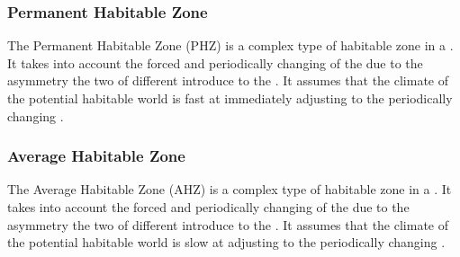 \documentclass[letterpaper,10pt,english]{sphinxmanual}
\begin{document}
\subsubsection{Permanent Habitable Zone}
\label{\detokenize{quantities/habitability/habitable_zones/permanent_habitable_zone:permanent-habitable-zone}}\label{\detokenize{quantities/habitability/habitable_zones/permanent_habitable_zone::doc}}\label{\detokenize{quantities/habitability/habitable_zones/permanent_habitable_zone:id1}}
\sphinxAtStartPar
The Permanent Habitable Zone (PHZ) is a complex type of habitable zone in a {\hyperref[\detokenize{celestial_systems/binary_system:id1}]{}}.
It takes into account the forced and periodically changing {\hyperref[\detokenize{quantities/orbital/eccentricity:id1}]{}}
of the {\hyperref[\detokenize{celestial_bodies/planet:id1}]{}} due to the asymmetry
the two {\hyperref[\detokenize{celestial_bodies/star:id1}]{}} of different {\hyperref[\detokenize{quantities/material/mass:id1}]{}} introduce to the {\hyperref[\detokenize{celestial_systems/stellar_system:id1}]{}}.
It assumes that the climate of the potential habitable world is fast at immediately adjusting to the periodically changing
{\hyperref[\detokenize{quantities/orbital/eccentricity:id1}]{}}.


\subsubsection{Average Habitable Zone}
\label{\detokenize{quantities/habitability/habitable_zones/average_habitable_zone:average-habitable-zone}}\label{\detokenize{quantities/habitability/habitable_zones/average_habitable_zone::doc}}\label{\detokenize{quantities/habitability/habitable_zones/average_habitable_zone:id1}}
\sphinxAtStartPar
The Average Habitable Zone (AHZ) is a complex type of habitable zone in a {\hyperref[\detokenize{celestial_systems/binary_system:id1}]{}}.
It takes into account the forced and periodically changing {\hyperref[\detokenize{quantities/orbital/eccentricity:id1}]{}}
of the {\hyperref[\detokenize{celestial_bodies/planet:id1}]{}} due to the asymmetry
the two {\hyperref[\detokenize{celestial_bodies/star:id1}]{}} of different {\hyperref[\detokenize{quantities/material/mass:id1}]{}} introduce to the {\hyperref[\detokenize{celestial_systems/stellar_system:id1}]{}}.
It assumes that the climate of the potential habitable world is slow at adjusting to the periodically changing
{\hyperref[\detokenize{quantities/orbital/eccentricity:id1}]{}}.
\end{document}
